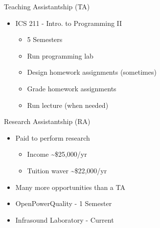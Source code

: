 \documentclass{beamer}
\begin{document}
\begin{frame}{Teaching Assistantship (TA)}
\begin{itemize}
	\item ICS 211 - Intro. to Programming II
	\begin{itemize}
		\item 5 Semesters
		\item Run programming lab
		\item Design homework assignments (sometimes)
		\item Grade homework assignments
		\item Run lecture (when needed)
	\end{itemize}
\end{itemize}
\end{frame}

\begin{frame}{Research Assistantship (RA)}
\begin{itemize}
	\item Paid to perform research 
	\begin{itemize}
		\item Income \textasciitilde\$25,000/yr
		\item Tuition waver \textasciitilde\$22,000/yr
	\end{itemize}
	\item Many more opportunities than a TA
	\item OpenPowerQuality - 1 Semester
	\item Infrasound Laboratory - Current
\end{itemize}
\end{frame}
\end{document}
